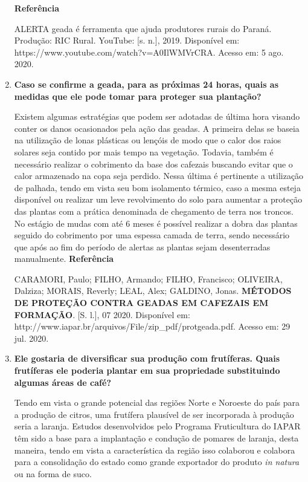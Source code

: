 \documentclass[a4paper, 12pt, brazilian]{article}
\begin{document}
\begin{enumerate}
		\textbf{Referência}
		
		ALERTA geada é ferramenta que ajuda produtores rurais do Paraná. Produção: RIC Rural. YouTube: [s. n.], 2019. Disponível em: https://www.youtube.com/watch?v=A0Il\-WMVrCRA. Acesso em: 5 ago. 2020.
		
		\item\textbf{Caso se confirme a geada, para as próximas 24 horas, quais as medidas que ele pode tomar para proteger sua plantação?}
		
		\hspace{.5cm}Existem algumas estratégias que podem ser adotadas de última hora visando conter os danos ocasionados pela ação das geadas. A primeira delas se baseia na utilização de lonas plásticas ou lençóis de modo que o calor dos raios solares seja contido por mais tempo na vegetação. Todavia, também é necessário realizar o cobrimento da base dos cafezais buscando evitar que o calor armazenado na copa seja perdido. Nessa última é pertinente a utilização de palhada, tendo em vista seu bom isolamento térmico, caso a mesma esteja disponível ou realizar um leve revolvimento do solo para aumentar a proteção das plantas com a prática denominada de chegamento de terra nos troncos.
		No estágio de mudas com até 6 meses é possível realizar a dobra das plantas seguido do cobrimento por uma espessa camada de terra, sendo necessário que após ao fim do período de alertas as plantas sejam desenterradas manualmente.
		\newpage
		\textbf{Referência}
		
		CARAMORI, Paulo; FILHO, Armando; FILHO, Francisco; OLIVEIRA, Dalziza; MORAIS, Reverly; LEAL, Alex; GALDINO, Jonas. \textbf{MÉTODOS DE PROTEÇÃO CONTRA GEADAS EM CAFEZAIS EM FORMAÇÃO}. [S. l.], 07 2020. Disponível em: http://www.iapar.br/arquivos/File/zip\_pdf/protgeada.pdf. Acesso em: 29 jul. 2020.
		
		\item\textbf{Ele gostaria de diversificar sua produção com frutíferas. Quais frutíferas ele poderia plantar em sua propriedade substituindo algumas áreas de café?}
		
		\hspace{.5cm}Tendo em vista o grande potencial das regiões Norte e Noroeste do país para a produção de citros, uma frutífera plausível de ser incorporada à produção seria a laranja. Estudos desenvolvidos pelo Programa Fruticultura do IAPAR têm sido a base para a implantação e condução de pomares de laranja, desta maneira, tendo em vista a característica da região isso colaborou e colabora para a consolidação do estado como grande exportador do produto \textit{in natura} ou na forma de suco.
		

\end{enumerate}
\end{document}
